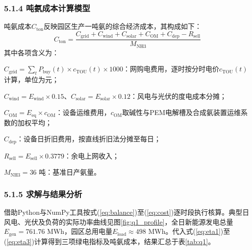 \documentclass[zihao=-4,a4paper]{ctexart} %
\begin{document}
	\subsubsection*{5.1.4 吨氨成本计算模型}
	吨氨成本$C_{\text{ton}}$反映园区生产一吨氨的综合经济成本，其构成如下：
	\begin{equation}
		C_{\text{ton}} = \frac{C_{\text{grid}} + C_{\text{wind}} + C_{\text{solar}} + C_{\text{OM}} + C_{\text{dep}} - R_{\text{sell}}}{M_{\text{NH3}}}
		\label{eq:cost}
	\end{equation}
	其中各项含义为：
	\par $C_{\text{grid}} = \sum_{t} P_{\text{buy}}(t) \times c_{\text{TOU}}(t) \times 1000$：网购电费用，逐时按分时电价$c_{\text{TOU}}(t)$计算，单位为元；
	\par $C_{\text{wind}} = E_{\text{wind}} \times 0.15$、$C_{\text{solar}} = E_{\text{solar}} \times 0.12$：风电与光伏的度电成本分摊；
	\par $C_{\text{OM}} = E_{\text{eq}} \times c_{\text{OM}}$：设备运维费用，$c_{\text{OM}}$取碱性与PEM电解槽及合成氨装置运维系数的加权平均；
	\par $C_{\text{dep}}$：设备日折旧费用，按直线折旧法分摊至每日；
	\par $R_{\text{sell}} = E_{\text{sell}} \times 0.3779$：余电上网收入；
	\par $M_{\text{NH3}} = 36$ 吨：基准日产氨量。
	\subsubsection*{5.1.5 求解与结果分析}
	借助Python与NumPy工具按式(\ref{eq:balance})至(\ref{eq:cost})逐时段执行核算。典型日风电、光伏及负荷的实际功率曲线见图\ref{fig:q1_profile}，全日新能源发电总量$E_{\text{gen}} = 761.76$ MWh，园区总用电量$E_{\text{load}} \approx 498$ MWh。代入式(\ref{eq:eta1})至(\ref{eq:eta3})计算得到三项绿电指标及吨氨成本，结果汇总于表\ref{tab:q1}。
	
\end{document}
